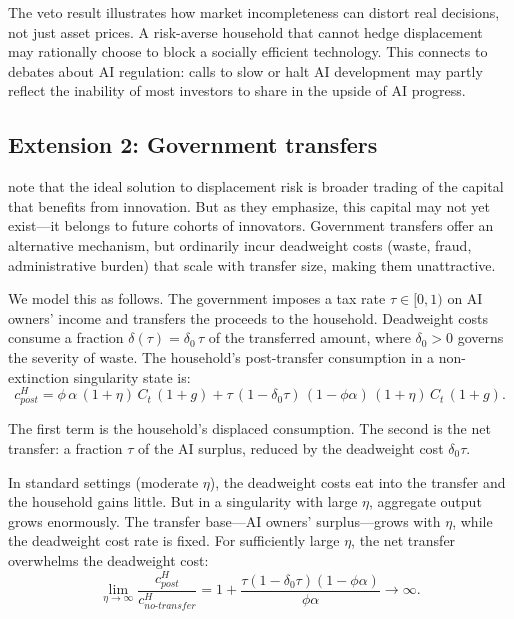 \documentclass[12pt]{article}
\begin{document}
The veto result illustrates how market incompleteness can distort real decisions, not just asset prices. A risk-averse household that cannot hedge displacement may rationally choose to block a socially efficient technology. This connects to debates about AI regulation: calls to slow or halt AI development may partly reflect the inability of most investors to share in the upside of AI progress.

\subsection{Extension 2: Government transfers} %

\citet{GKP2012} note that the ideal solution to displacement risk is broader trading of the capital that benefits from innovation. But as they emphasize, this capital may not yet exist---it belongs to future cohorts of innovators. Government transfers offer an alternative mechanism, but ordinarily incur deadweight costs (waste, fraud, administrative burden) that scale with transfer size, making them unattractive.

We model this as follows. The government imposes a tax rate $\tau \in [0,1)$ on AI owners' income and transfers the proceeds to the household. Deadweight costs consume a fraction $\delta(\tau) = \delta_0 \, \tau$ of the transferred amount, where $\delta_0 > 0$ governs the severity of waste. The household's post-transfer consumption in a non-extinction singularity state is:
%
\begin{equation}
c^H_{post} = \phi \, \alpha \, (1+\eta) \, C_t \, (1+g) + \tau \, (1 - \delta_0 \tau) \, (1 - \phi\alpha) \, (1+\eta) \, C_t \, (1+g). \label{eq:transfer-consumption}
\end{equation}

The first term is the household's displaced consumption. The second is the net transfer: a fraction $\tau$ of the AI surplus, reduced by the deadweight cost $\delta_0 \tau$.

In standard settings (moderate $\eta$), the deadweight costs eat into the transfer and the household gains little. But in a singularity with large $\eta$, aggregate output grows enormously. The transfer base---AI owners' surplus---grows with $\eta$, while the deadweight cost rate is fixed. For sufficiently large $\eta$, the net transfer overwhelms the deadweight cost:
%
\begin{equation}
\lim_{\eta \to \infty} \frac{c^H_{post}}{c^H_{no\text{-}transfer}} = 1 + \frac{\tau(1 - \delta_0 \tau)(1 - \phi\alpha)}{\phi\alpha} \to \infty. \label{eq:transfer-limit}
\end{equation}
\end{document}
